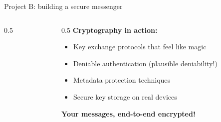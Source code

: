\ifdefined\PRESENTATION\else\PassOptionsToClass{handout}{beamer}\fi\documentclass[aspectratio=169, lualatex]{beamer}
\begin{document}
\begin{frame}{Project B: building a secure messenger}
	\begin{columns}[c]
		\begin{column}{0.5\textwidth}
		\end{column}
		\begin{column}{0.5\textwidth}
			\textbf{Cryptography in action:}
			\begin{itemize}[<+->]
				\item Key exchange protocols that feel like magic
				\item Deniable authentication (plausible deniability!)
				\item Metadata protection techniques
				\item Secure key storage on real devices
			\end{itemize}
			\vspace{0.5cm}
			\textcolor{cipherprimary}{\textbf{Your messages, end-to-end encrypted!}}
		\end{column}
	\end{columns}
\end{frame}
\end{document}
